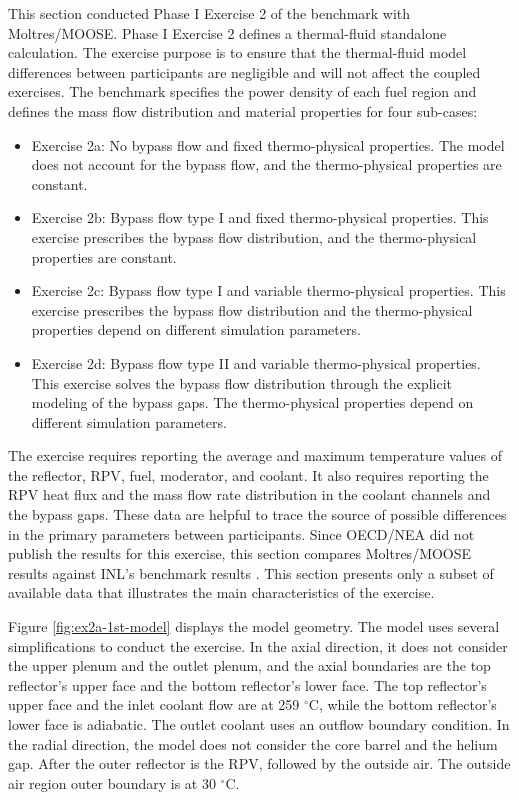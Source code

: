 This section conducted Phase I Exercise 2 of the benchmark with Moltres/MOOSE.
Phase I Exercise 2 defines a thermal-fluid standalone calculation.
The exercise purpose is to ensure that the thermal-fluid model differences between participants are negligible and will not affect the coupled exercises.
The benchmark specifies the power density of each fuel region and defines the mass flow distribution and material properties for four sub-cases:
\begin{itemize}
  \item Exercise 2a: No bypass flow and fixed thermo-physical properties. The model does not account for the bypass flow, and the thermo-physical properties are constant.
  \item Exercise 2b: Bypass flow type I and fixed thermo-physical properties. This exercise prescribes the bypass flow distribution, and the thermo-physical properties are constant.
  \item Exercise 2c: Bypass flow type I and variable thermo-physical properties. This exercise prescribes the bypass flow distribution and the thermo-physical properties depend on different simulation parameters.
  \item Exercise 2d: Bypass flow type II and variable thermo-physical properties. This exercise solves the bypass flow distribution through the explicit modeling of the bypass gaps. The thermo-physical properties depend on different simulation parameters.
\end{itemize}

The exercise requires reporting the average and maximum temperature values of the reflector, \gls{RPV}, fuel, moderator, and coolant.
It also requires reporting the RPV heat flux and the mass flow rate distribution in the coolant channels and the bypass gaps.
These data are helpful to trace the source of possible differences in the primary parameters between participants.
Since OECD/NEA did not publish the results for this exercise, this section compares Moltres/MOOSE results against INL's benchmark results \cite{strydom_inl_2013}.
This section presents only a subset of available data that illustrates the main characteristics of the exercise.

Figure \ref{fig:ex2a-1st-model} displays the model geometry.
The model uses several simplifications to conduct the exercise.
In the axial direction, it does not consider the upper plenum and the outlet plenum, and the axial boundaries are the top reflector's upper face and the bottom reflector's lower face.
The top reflector's upper face and the inlet coolant flow are at 259 $^{\circ}$C, while the bottom reflector's lower face is adiabatic.
The outlet coolant uses an outflow boundary condition.
In the radial direction, the model does not consider the core barrel and the helium gap.
After the outer reflector is the RPV, followed by the outside air.
The outside air region outer boundary is at 30 $^{\circ}$C.

